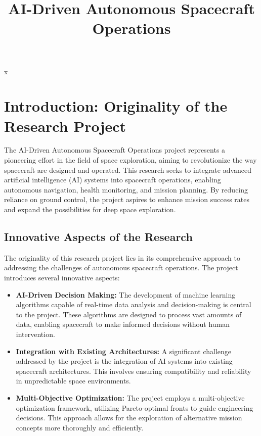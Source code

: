 \documentclass[a4paper,12pt]{article}
\title{AI-Driven Autonomous Spacecraft Operations}
\author{}
\date{}
\begin{document}
\maketitle
\tableofcontents
\newpage

x
\section{Introduction: Originality of the Research Project}

The AI-Driven Autonomous Spacecraft Operations project represents a pioneering effort in the field of space exploration, aiming to revolutionize the way spacecraft are designed and operated. This research seeks to integrate advanced artificial intelligence (AI) systems into spacecraft operations, enabling autonomous navigation, health monitoring, and mission planning. By reducing reliance on ground control, the project aspires to enhance mission success rates and expand the possibilities for deep space exploration.

\subsection{Innovative Aspects of the Research}

The originality of this research project lies in its comprehensive approach to addressing the challenges of autonomous spacecraft operations. The project introduces several innovative aspects:

\begin{itemize}
    \item \textbf{AI-Driven Decision Making:} The development of machine learning algorithms capable of real-time data analysis and decision-making is central to the project. These algorithms are designed to process vast amounts of data, enabling spacecraft to make informed decisions without human intervention.
    \item \textbf{Integration with Existing Architectures:} A significant challenge addressed by the project is the integration of AI systems into existing spacecraft architectures. This involves ensuring compatibility and reliability in unpredictable space environments.
    \item \textbf{Multi-Objective Optimization:} The project employs a multi-objective optimization framework, utilizing Pareto-optimal fronts to guide engineering decisions. This approach allows for the exploration of alternative mission concepts more thoroughly and efficiently.
\end{itemize}
\end{document}
